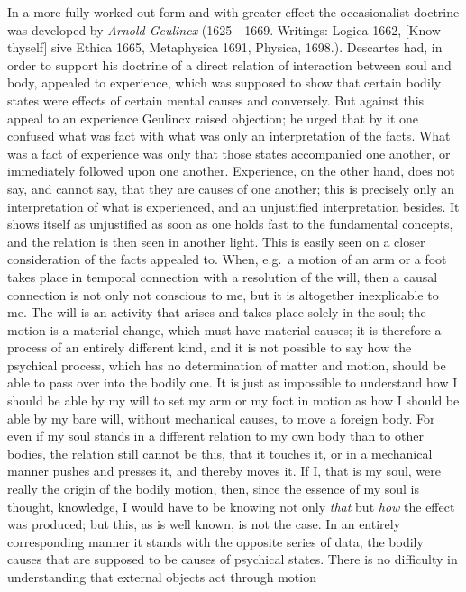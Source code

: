 In a more fully worked-out form and with greater effect the occasionalist
doctrine was developed by \emph{Arnold Geulincx} (1625---1669. Writings:
Logica 1662,  [Know thyself] sive Ethica 1665,
Metaphysica 1691, Physica, 1698.). Descartes had, in order to support his
doctrine of a direct relation of interaction between soul and body,
appealed to experience, which was supposed to show that certain bodily
states were effects of certain mental causes and conversely. But
against this appeal to an experience Geulincx raised objection; he urged
that by it one confused what was fact with what was only an
interpretation of the facts. What was a fact of experience was only that
those states accompanied one another, or immediately followed upon one
another. Experience, on the other hand, does not say, and cannot say,
that they are causes of one another; this is precisely only an
interpretation of what is experienced, and an unjustified interpretation
besides. It shows itself as unjustified as soon as one holds fast to the
fundamental concepts, and the relation is then seen in another light.
This is easily seen on a closer consideration of the facts appealed to.
When, e.g.\ a motion of an arm or a foot takes place in temporal
connection with a resolution of the will, then a causal connection is
not only not conscious to me, but it is altogether inexplicable to me.
The will is an activity that arises and takes place solely in the soul;
the motion is a material change, which must have material causes; it is
therefore a process of an entirely different kind, and it is not
possible to say how the psychical process, which has no determination
of matter and motion, should be able to pass over into the bodily one.
It is just as impossible to understand how I should be able by
my will to set my arm or my foot in motion as how I should be able by my
bare will, without mechanical causes, to move a foreign body. For even
if my soul stands in a different relation to my own body than to other
bodies, the relation still cannot be this, that it touches it, or in a
mechanical manner pushes and presses it, and thereby moves it. If I,
that is my soul, were really the origin of the bodily motion, then,
since the essence of my soul is thought, knowledge, I would have to be
knowing not only \emph{that} but \emph{how} the effect was produced; but
this, as is well known, is not the case. In an entirely corresponding
manner it stands with the opposite series of data, the bodily causes
that are supposed to be causes of psychical states. There is no
difficulty in understanding that external objects act through motion
